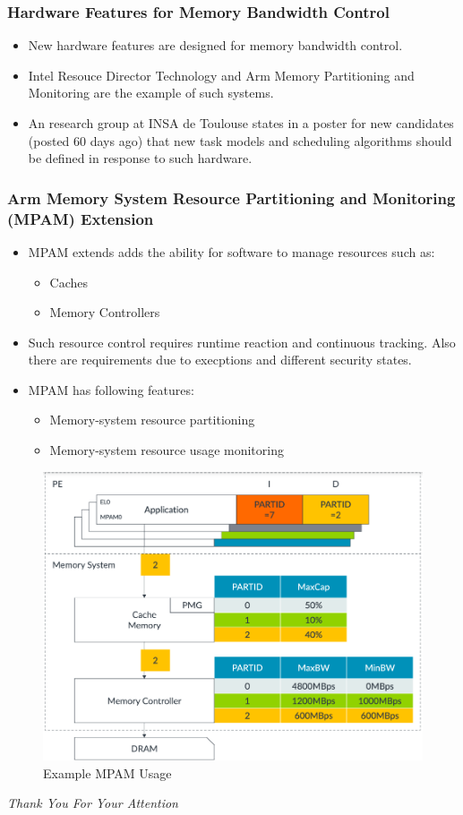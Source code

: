 \documentclass{beamer}
\begin{document}
\begin{frame}
    \frametitle{Hardware Features for Memory Bandwidth Control}
    \begin{itemize}
        \item New hardware features are designed for memory bandwidth control.
        \item Intel Resouce Director Technology and Arm Memory Partitioning
            and Monitoring are the example of such systems.
        \item An research group at INSA de Toulouse states in a poster for new
            candidates (posted 60 days ago) that new task models and scheduling
            algorithms should be defined in response to such hardware.
    \end{itemize}
\end{frame}

\begin{frame}
    \frametitle{Arm Memory System Resource Partitioning and Monitoring (MPAM)
    Extension}
    \begin{itemize}
        \item MPAM extends adds the ability for software to manage resources
            such as:
            \begin{itemize}
                \item Caches
                \item Memory Controllers
            \end{itemize}
        \item Such resource control requires runtime reaction and continuous
            tracking. Also there are requirements due to execptions and
            different security states.
        \item MPAM has following features:
            \begin{itemize}
                \item Memory-system resource partitioning
                \item Memory-system resource usage monitoring
            \end{itemize}
    \end{itemize}
\end{frame}

\begin{frame}
    \begin{figure}
        \centering
        \includegraphics[width=0.80\columnwidth]{mpam.png}
        \caption{Example MPAM Usage}
        \label{fig:MPAM}
    \end{figure}
\end{frame}

\begin{frame}
  \centering \Large
  \emph{Thank You For Your Attention}
\end{frame}
\end{document}
